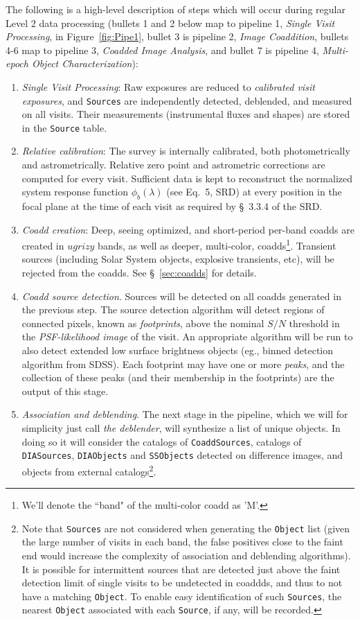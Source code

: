 \documentclass[12pt]{article}
\newcommand{\code}[1]{\texttt{#1}}
\newcommand{\DIASources}{\code{DIASources}\xspace}
\newcommand{\DIAObjects}{\code{DIAObjects}\xspace}
\newcommand{\Object}{\code{Object}\xspace}
\newcommand{\Source}{\code{Source}\xspace}
\newcommand{\Sources}{\code{Sources}\xspace}
\newcommand{\CoaddSources}{\code{CoaddSources}\xspace}
\newcommand{\SSObjects}{\code{SSObjects}\xspace}
\begin{document}
The following is a high-level description of steps which will occur during regular Level 2 data processing
(bullets 1 and 2 below map to pipeline 1, {\em Single Visit Processing}, in Figure~\ref{fig:Pipe1}, bullet 3 is
pipeline 2, {\em Image Coaddition}, bullets 4-6 map to pipeline 3, {\em Coadded Image Analysis}, and
bullet 7 is pipeline 4, {\em Multi-epoch Object Characterization}):
\begin{enumerate}
    \item {\em Single Visit Processing}: Raw exposures are reduced to {\em calibrated visit exposures}, and \Sources are independently detected, deblended, and measured on all visits. Their measurements (instrumental fluxes and shapes) are stored in the \Source table.
    \item {\em Relative calibration}: The survey is internally calibrated, both photometrically and astrometrically. Relative zero point and astrometric corrections are computed for every visit. Sufficient data is kept to reconstruct the normalized system response function $\phi_b(\lambda)$ (see Eq.~5, SRD) at every position in the focal plane at the time of each visit as required by \S~3.3.4 of the SRD.
    \item {\em Coadd creation}: Deep, seeing optimized, and short-period per-band coadds are created in $ugrizy$ bands, as well as deeper, multi-color, coadds\footnote{We'll denote the ``band" of the multi-color coadd as 'M'.}. Transient sources (including Solar System objects, explosive transients, etc), will be rejected from the coadds. See \S~\ref{sec:coadds} for details.
    \item {\em Coadd source detection}. Sources will be detected on all coadds generated in the previous step. The source detection algorithm will detect regions of connected pixels, known as {\em footprints}, above the nominal $S/N$ threshold in the {\em PSF-likelihood image} of the visit. An appropriate algorithm will be run to also detect extended low surface brightness objects
(eg., binned detection algorithm from SDSS).  Each footprint may have one or more {\em peaks}, and the collection of these peaks (and their membership in the footprints) are the output of this stage.
    \item {\em Association and deblending}. The next stage in the pipeline, which we will for simplicity just call {\em the deblender}, will synthesize a list of unique objects. In doing so it will consider the catalogs of \CoaddSources, catalogs of \DIASources, \DIAObjects and \SSObjects detected on difference images, and objects from external
catalogs\footnote{Note that \Sources are not considered when generating the \Object list (given the large
number of visits in each band, the false positives close to the faint end would increase the complexity of
association and deblending algorithms). It is possible for intermittent sources that are detected just above
the faint detection limit of single visits to be undetected in coaddds, and thus to not have a matching \Object.
To enable easy identification of such \Sources, the nearest \Object associated with each \Source, if any, will be recorded.}.


\end{enumerate}
\end{document}
